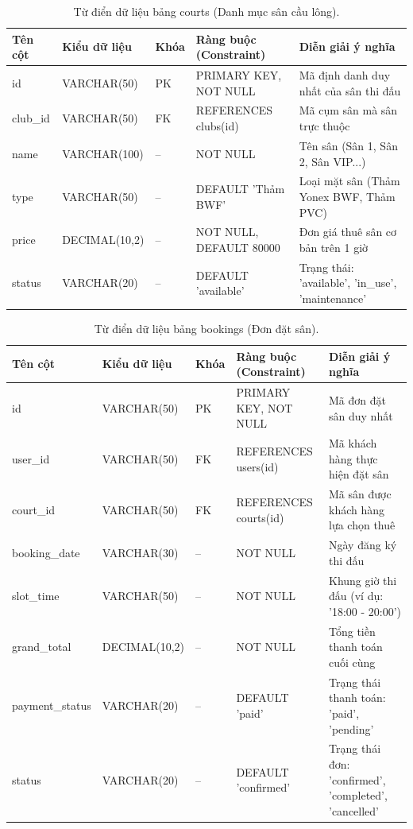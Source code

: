 \begin{table}[H]
\centering
\caption{Từ điển dữ liệu bảng courts (Danh mục sân cầu lông).}
\label{tab:dict-courts}
\small
\begin{tabular*}{\textwidth}{@{\extracolsep{\fill}}l l l l p{}}
\toprule
\textbf{Tên cột} & \textbf{Kiểu dữ liệu} & \textbf{Khóa} & \textbf{Ràng buộc (Constraint)} & \textbf{Diễn giải ý nghĩa} \\
\midrule
id & VARCHAR(50) & PK & PRIMARY KEY, NOT NULL & Mã định danh duy nhất của sân thi đấu \\
club\_id & VARCHAR(50) & FK & REFERENCES clubs(id) & Mã cụm sân mà sân trực thuộc \\
name & VARCHAR(100) & -- & NOT NULL & Tên sân (Sân 1, Sân 2, Sân VIP...) \\
type & VARCHAR(50) & -- & DEFAULT 'Thảm BWF' & Loại mặt sân (Thảm Yonex BWF, Thảm PVC) \\
price & DECIMAL(10,2) & -- & NOT NULL, DEFAULT 80000 & Đơn giá thuê sân cơ bản trên 1 giờ \\
status & VARCHAR(20) & -- & DEFAULT 'available' & Trạng thái: 'available', 'in\_use', 'maintenance' \\
\bottomrule
\end{tabular*}
\end{table}

\begin{table}[H]
\centering
\caption{Từ điển dữ liệu bảng bookings (Đơn đặt sân).}
\label{tab:dict-bookings}
\small
\begin{tabular*}{\textwidth}{@{\extracolsep{\fill}}l l l l p{}}
\toprule
\textbf{Tên cột} & \textbf{Kiểu dữ liệu} & \textbf{Khóa} & \textbf{Ràng buộc (Constraint)} & \textbf{Diễn giải ý nghĩa} \\
\midrule
id & VARCHAR(50) & PK & PRIMARY KEY, NOT NULL & Mã đơn đặt sân duy nhất \\
user\_id & VARCHAR(50) & FK & REFERENCES users(id) & Mã khách hàng thực hiện đặt sân \\
court\_id & VARCHAR(50) & FK & REFERENCES courts(id) & Mã sân được khách hàng lựa chọn thuê \\
booking\_date & VARCHAR(30) & -- & NOT NULL & Ngày đăng ký thi đấu \\
slot\_time & VARCHAR(50) & -- & NOT NULL & Khung giờ thi đấu (ví dụ: '18:00 - 20:00') \\
grand\_total & DECIMAL(10,2) & -- & NOT NULL & Tổng tiền thanh toán cuối cùng \\
payment\_status & VARCHAR(20) & -- & DEFAULT 'paid' & Trạng thái thanh toán: 'paid', 'pending' \\
status & VARCHAR(20) & -- & DEFAULT 'confirmed' & Trạng thái đơn: 'confirmed', 'completed', 'cancelled' \\
\bottomrule
\end{tabular*}
\end{table}


